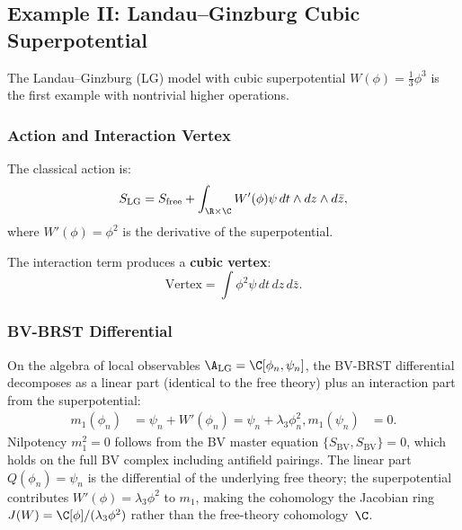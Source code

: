 \subsection{Example II: Landau--Ginzburg Cubic Superpotential}

The Landau--Ginzburg (LG) model with cubic superpotential $W(\phi) = \frac{1}{3} \phi^3$ is the first example with nontrivial higher operations.

\subsubsection{Action and Interaction Vertex}

The classical action is:
\begin{equation}
S_{\text{LG}} = S_{\text{free}} + \int_{\R \times \C} W'(\phi) \psi \, dt \wedge dz \wedge d\bar{z},
\end{equation}
where $W'(\phi) = \phi^2$ is the derivative of the superpotential.

The interaction term produces a \textbf{cubic vertex}:
\begin{equation}
\text{Vertex} = \int \phi^2 \psi \, dt \, dz \, d\bar{z}.
\end{equation}

\subsubsection{BV-BRST Differential}

On the algebra of local observables $\A_{\text{LG}} = \C[\phi_n, \psi_n]$, the BV-BRST differential decomposes as a linear part (identical to the free theory) plus an interaction part from the superpotential:
\begin{align}
m_1(\phi_n) &= \psi_n + W'(\phi_n) = \psi_n + \lambda_3 \phi_n^2, %
m_1(\psi_n) &= 0. %
\end{align}
Nilpotency $m_1^2 = 0$ follows from the BV master equation $\{S_{\mathrm{BV}}, S_{\mathrm{BV}}\} = 0$, which holds on the full BV complex including antifield pairings. The linear part $Q(\phi_n) = \psi_n$ is the differential of the underlying free theory; the superpotential contributes $W'(\phi) = \lambda_3\phi^2$ to $m_1$, making the cohomology the Jacobian ring $J(W) = \C[\phi]/(\lambda_3 \phi^2)$ rather than the free-theory cohomology~$\C$.

